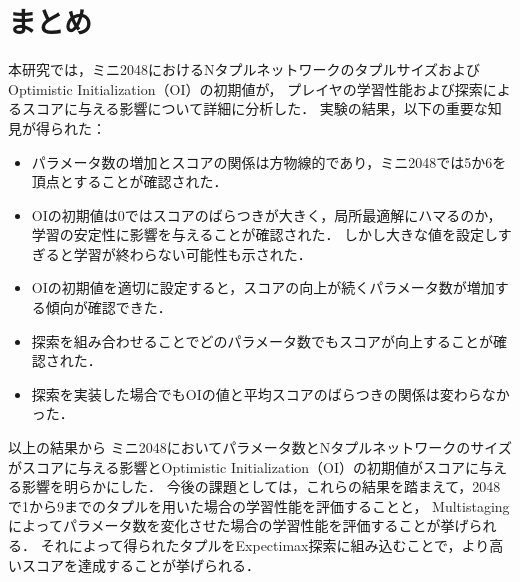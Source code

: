 \section{まとめ}
本研究では，ミニ2048におけるNタプルネットワークのタプルサイズおよびOptimistic Initialization（OI）の初期値が，
プレイヤの学習性能および探索によるスコアに与える影響について詳細に分析した．
実験の結果，以下の重要な知見が得られた：
\begin{itemize}
\item パラメータ数の増加とスコアの関係は方物線的であり，ミニ2048では5か6を頂点とすることが確認された．
\item OIの初期値は0ではスコアのばらつきが大きく，局所最適解にハマるのか，学習の安定性に影響を与えることが確認された．
しかし大きな値を設定しすぎると学習が終わらない可能性も示された．
\item OIの初期値を適切に設定すると，スコアの向上が続くパラメータ数が増加する傾向が確認できた．
\item 探索を組み合わせることでどのパラメータ数でもスコアが向上することが確認された．
\item 探索を実装した場合でもOIの値と平均スコアのばらつきの関係は変わらなかった．
\end{itemize}

以上の結果から
ミニ2048においてパラメータ数とNタプルネットワークのサイズがスコアに与える影響とOptimistic Initialization（OI）の初期値がスコアに与える影響を明らかにした．
今後の課題としては，これらの結果を踏まえて，2048で1から9までのタプルを用いた場合の学習性能を評価することと，
Multistagingによってパラメータ数を変化させた場合の学習性能を評価することが挙げられる．
それによって得られたタプルをExpectimax探索に組み込むことで，より高いスコアを達成することが挙げられる．
